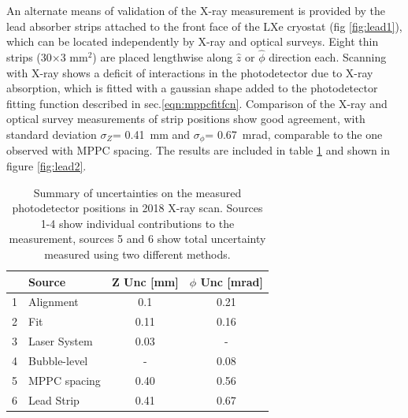 An alternate means of validation of the X-ray measurement is
provided by the lead absorber strips attached to the front face
of the LXe cryostat (fig \ref{fig:lead1}), which can be located
independently by X-ray and optical surveys.  Eight thin strips
(30$\times$3 mm$^2$) are placed lengthwise along $\hat{z}$ or
$\hat{\phi}$ direction each.  Scanning with X-ray shows a deficit
of interactions in the photodetector due to X-ray absorption,
which is fitted with a gaussian shape added to the photodetector
fitting function described in sec.\ref{eqn:mppcfitfcn}.
Comparison of the X-ray and optical survey measurements of strip
positions show good agreement, with standard deviation
$\sigma_Z$= 0.41~mm and $\sigma_\phi$= 0.67~mrad, comparable to
the one observed with MPPC spacing.  The results are included in
table \ref{tab:uncertainties} and shown in figure \ref{fig:lead2}.

\begin{table}
\begin{tabular}{clcc}
 & Source & Z Unc [mm] & $\phi$ Unc [mrad] \\
  \hline
1& Alignment      & 0.1  & 0.21  \\
2& Fit           &  0.11 & 0.16  \\
3& Laser System  &  0.03 &  - \\
4& Bubble-level  &  -    & 0.08 \\
5& MPPC spacing  & 0.40  & 0.56 \\
6& Lead Strip   &  0.41  & 0.67 \\
\end{tabular}
\caption{Summary of uncertainties on the measured photodetector
positions in 2018 X-ray scan. Sources 1-4 show individual
contributions to the measurement, sources 5 and 6 show
total uncertainty measured using two different methods.
}
\label{tab:uncertainties}
\end{table}

